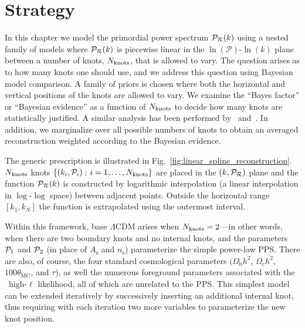 \section{Strategy}
In this chapter we model the primordial power spectrum \(\mathcal{P}_\mathcal{R}(k)\) using a nested family of models where \(\mathcal{P}_\mathcal{R}(k)\) is piecewise linear in the \(\ln (\mathcal{P})\)-\(\ln (k)\) plane between a number of knots, \(\Nknots\), that is allowed to vary. The question arises as to how many knots one should use, and we address this question using Bayesian model comparison.  A family of priors is chosen where both the horizontal and vertical positions of the knots are allowed to vary. We examine the ``Bayes factor'' or ``Bayesian evidence'' as a function of \(\Nknots\) to decide how many knots are statistically justified.  A similar analysis has been performed by~\cite{vazquez_knots} and~\cite{knottedsky1}.  In addition, we marginalize over all possible numbers of knots to obtain an averaged reconstruction weighted according to the Bayesian evidence.

The generic prescription is illustrated in Fig.~\ref{fig:linear_spline_reconstruction}. \(\Nknots\) knots \(\{(k_i,\mathcal{P}_{i})\,\): \(i=1,\ldots,N_\mathrm{knots}\}\) are placed in the \((k,\mathcal{P}_\mathcal{R})\) plane and the function \(\mathcal{P}_\mathcal{R}(k)\) is constructed by logarithmic interpolation (a linear interpolation in \(\log\)-\(\log\) space) between adjacent points.  Outside the horizontal range \([k_1,k_N]\) the function is extrapolated using the outermost interval.

Within this framework, base \(\Lambda\)CDM arises when \({N_\mathrm{knots}=2}\)---in other words, when there are two boundary knots and no internal knots, and the parameters \(\mathcal{P}_{1}\) and \(\mathcal{P}_{2}\) (in place of \(A_\mathrm{s}\) and \(n_\mathrm{s}\)) parameterize the simple power-law PPS\@. There are also, of course, the four standard cosmological parameters \((\Omega_{\mathrm{b}} h^2\), \(\Omega_{\mathrm{c}} h^2\), \(100\theta_{\mathrm{MC}}\), and \(\tau\)), as well the numerous foreground parameters associated with the \Planck\ high-\(\ell\) likelihood, all of which are unrelated to the PPS\@.  This simplest model can be extended iteratively by successively inserting an additional internal knot, thus requiring with each iteration two more variables to parameterize the new knot position.


\begin{table}[tp]
  \centering
  
  \caption{%
    Prior for moveable knot positions.  The \(\PR\) positions are distributed in a log-uniform manner across a wide range.  The \(k\) positions are also log-uniformly distributed across the entire range needed by \CosmoMC{} and are sorted so that \({k_1<\cdots<k_{\Nknots}}\).  When we marginalize over the number of knots, \(\Nknots\), we assume a uniform prior between 2 and 10. }\label{tab:P_k_priors} 
\end{table}


